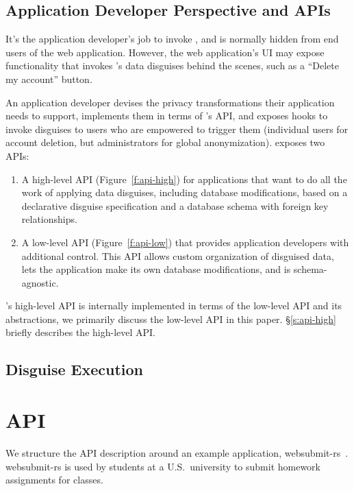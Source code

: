 \subsection{Application Developer Perspective and APIs}
%
It's the application developer's job to invoke \sys, and \sys is normally
hidden from end users of the web application.
%
However, the web application's UI may expose functionality that invokes \sys's
data disguises behind the scenes, such as a ``Delete my account'' button.
%

%
An application developer devises the privacy transformations their application needs to
support, implements them in terms of \sys's API, and exposes hooks to invoke disguises to
users who are empowered to trigger them (\eg individual users for account deletion, but
administrators for global anonymization).
%
\sys exposes two APIs:
\begin{enumerate}[nosep]
 \item A high-level API (Figure~\ref{f:api-high}) for applications that want \sys to do
   all the work of applying data disguises, including database modifications, based on
   a declarative disguise specification and a database schema with foreign key
   relationships.
 \item A low-level API (Figure~\ref{f:api-low}) that provides application developers with
   additional control. This API allows custom organization of disguised data, lets the
   application make its own database modifications, and is schema-agnostic.
\end{enumerate}
%
\sys's high-level API is internally implemented in terms of the low-level API and its
abstractions, we primarily discuss the low-level API in this paper.
%
\S\ref{s:api-high} briefly describes the high-level API.
%

\subsection{Disguise Execution}
%


\section{API}
\label{s:api}


%
We structure the API description around an example application, websubmit-rs~\cite{websubmit-rs}.
%
websubmit-rs is used by students at a U.S.\ university to submit homework assignments for classes.
%


